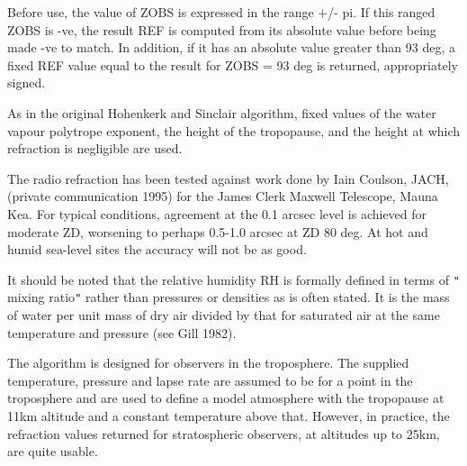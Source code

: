 \documentclass[twoside,11pt,nolof]{starlink}
\begin{document}
{{{         \sstitem
          Before use, the value of ZOBS is expressed in the range $+$/- pi.
         If this ranged ZOBS is -ve, the result REF is computed from its
         absolute value before being made -ve to match.  In addition, if
         it has an absolute value greater than 93 deg, a fixed REF value
         equal to the result for ZOBS = 93 deg is returned, appropriately
         signed.

         \sstitem
          As in the original Hohenkerk and Sinclair algorithm, fixed values
         of the water vapour polytrope exponent, the height of the
         tropopause, and the height at which refraction is negligible are
         used.

         \sstitem
          The radio refraction has been tested against work done by
         Iain Coulson, JACH, (private communication 1995) for the
         James Clerk Maxwell Telescope, Mauna Kea.  For typical conditions,
         agreement at the 0.1 arcsec level is achieved for moderate ZD,
         worsening to perhaps 0.5-1.0 arcsec at ZD 80 deg.  At hot and
         humid sea-level sites the accuracy will not be as good.

         \sstitem
          It should be noted that the relative humidity RH is formally
         defined in terms of \texttt{"} mixing ratio\texttt{"}  rather than pressures or
         densities as is often stated.  It is the mass of water per unit
         mass of dry air divided by that for saturated air at the same
         temperature and pressure (see Gill 1982).

         \sstitem
          The algorithm is designed for observers in the troposphere. The
         supplied temperature, pressure and lapse rate are assumed to be
         for a point in the troposphere and are used to define a model
         atmosphere with the tropopause at 11km altitude and a constant
         temperature above that.  However, in practice, the refraction
         values returned for stratospheric observers, at altitudes up to
         25km, are quite usable.
      }
   }
}
\end{document}
